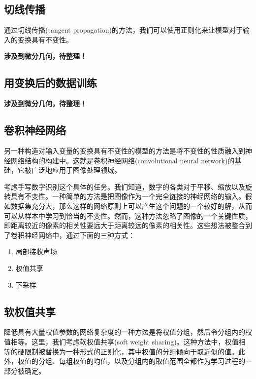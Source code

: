 \subsection*{切线传播}
通过切线传播(tangent propagation)的方法，我们可以使用正则化来让模型对于输入的变换具有不变性。

\textbf{涉及到微分几何，待整理！}
\subsection*{用变换后的数据训练}
\textbf{涉及到微分几何，待整理！}
\subsection*{卷积神经网络}
另一种构造对输入变量的变换具有不变性的模型的方法是将不变性的性质融入到神经网络结构的构建中。这就是卷积神经网络(convolutional neural network)的基础，它被广泛地应用于图像处理领域。

考虑手写数字识别这个具体的任务。我们知道，数字的各类对于平移、缩放以及旋转具有不变性。一种简单的方法是把图像作为一个完全链接的神经网络的输入。假如数据集充分大，那么这样的网络原则上可以产生这个问题的一个较好的解，从而可以从样本中学习到恰当的不变性。然而，这种方法忽略了图像的一个关键性质，即距离较近的像素的相关性要远大于距离较远的像素的相关性。这些想法被整合到了卷积神经网络中，通过下面的三种方式：
\begin{enumerate}[(1)]
	\item 局部接收声场
	\item 权值共享
	\item 下采样
\end{enumerate}
\subsection*{软权值共享}
降低具有大量权值参数的网络复杂度的一种方法是将权值分组，然后令分组内的权值相等。这里，我们考虑软权值共享(soft weight sharing)。这种方法中，权值相等的硬限制被替换为一种形式的正则化，其中权值的分组倾向于取近似的值。此外，权值的分组、每组权值的均值，以及分组内的取值范围全都作为学习过程的一部分被确定。


